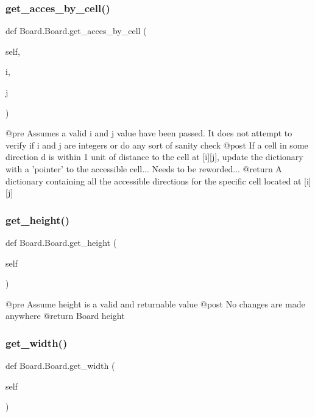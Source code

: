 \subsubsection{\texorpdfstring{get\+\_\+acces\+\_\+by\+\_\+cell()}{get\_acces\_by\_cell()}}
{\footnotesize\ttfamily def Board.\+Board.\+get\+\_\+acces\+\_\+by\+\_\+cell (\begin{DoxyParamCaption}\item[{}]{self,  }\item[{}]{i,  }\item[{}]{j }\end{DoxyParamCaption})}

\begin{DoxyVerb}@pre    Assumes a valid i and j value have been passed. It does not
attempt to verify if i and j are integers or do any sort of sanity
check
    @post   If a cell in some direction d is within 1 unit of distance
to the cell at [i][j], update the dictionary with a 'pointer' to the
accessible cell... Needs to be reworded...
    @return A dictionary containing all the accessible directions for
the specific cell located at [i][j]
\end{DoxyVerb}
 \mbox{\label{class_board_1_1_board_a6134b116a4421868d9b70a90cae3cf6a}} 
\subsubsection{\texorpdfstring{get\+\_\+height()}{get\_height()}}
{\footnotesize\ttfamily def Board.\+Board.\+get\+\_\+height (\begin{DoxyParamCaption}\item[{}]{self }\end{DoxyParamCaption})}

\begin{DoxyVerb}@pre    Assume height is a valid and returnable value
    @post   No changes are made anywhere
    @return Board height
\end{DoxyVerb}
 \mbox{\label{class_board_1_1_board_a5461757505c80b532af77cc6a651c7a7}} 
\subsubsection{\texorpdfstring{get\+\_\+width()}{get\_width()}}
{\footnotesize\ttfamily def Board.\+Board.\+get\+\_\+width (\begin{DoxyParamCaption}\item[{}]{self }\end{DoxyParamCaption})}

